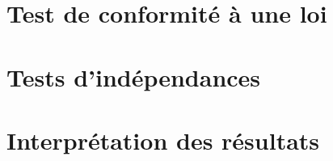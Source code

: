 
\section{Test de conformité à une loi}



\section{Tests d'indépendances}





\section{Interprétation des résultats}

